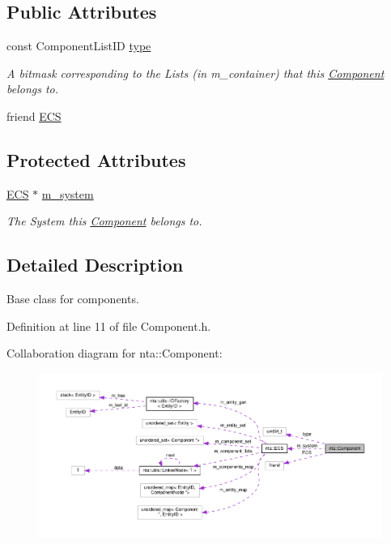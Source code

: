 \subsection*{Public Attributes}
\begin{DoxyCompactItemize}
\item 
\mbox{\label{classnta_1_1Component_a6c27f772281fd6ae13892386a75e7b4e}} 
const Component\+List\+ID \hyperlink{classnta_1_1Component_a6c27f772281fd6ae13892386a75e7b4e}{type}
\begin{DoxyCompactList}\small\item\em A bitmask corresponding to the Lists (in m\+\_\+container) that this \hyperlink{classnta_1_1Component}{Component} belongs to. \end{DoxyCompactList}\item 
friend \hyperlink{classnta_1_1Component_abed0426a01836855941e0236441eaf76}{E\+CS}
\end{DoxyCompactItemize}
\subsection*{Protected Attributes}
\begin{DoxyCompactItemize}
\item 
\mbox{\label{classnta_1_1Component_a382b6ded0bc1bfa123ac31a666d21b20}} 
\hyperlink{classnta_1_1ECS}{E\+CS} $\ast$ \hyperlink{classnta_1_1Component_a382b6ded0bc1bfa123ac31a666d21b20}{m\+\_\+system}
\begin{DoxyCompactList}\small\item\em The System this \hyperlink{classnta_1_1Component}{Component} belongs to. \end{DoxyCompactList}\end{DoxyCompactItemize}


\subsection{Detailed Description}
Base class for components. 

Definition at line 11 of file Component.\+h.



Collaboration diagram for nta\+:\+:Component\+:
\nopagebreak
\begin{figure}[H]
\begin{center}
\leavevmode
\includegraphics[width=350pt]{d2/de4/classnta_1_1Component__coll__graph}
\end{center}
\end{figure}


